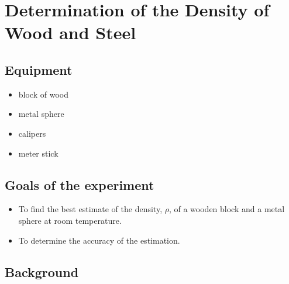 

%
%


\setcounter{chapter}{1}
\setcounter{equation}{0}
\setcounter{table}{0}
\setcounter{figure}{0}
  
\chapter{Determination of the Density of Wood and Steel}



\section{Equipment}
\begin{minipage}[t]{0.5\textwidth}
\begin{itemize}%
\item block of wood
\item metal sphere
\end{itemize}
\end{minipage}
\begin{minipage}[t]{0.5\textwidth}
\begin{itemize}%
\item calipers
\item meter stick
\end{itemize}
\end{minipage}



\section{Goals of the experiment}
\begin{itemize}
\item To find the best estimate of the density, $\rho$, of a wooden block and a metal sphere at room temperature.
\item To determine the accuracy of the estimation.
\end{itemize}
\section{Background}

